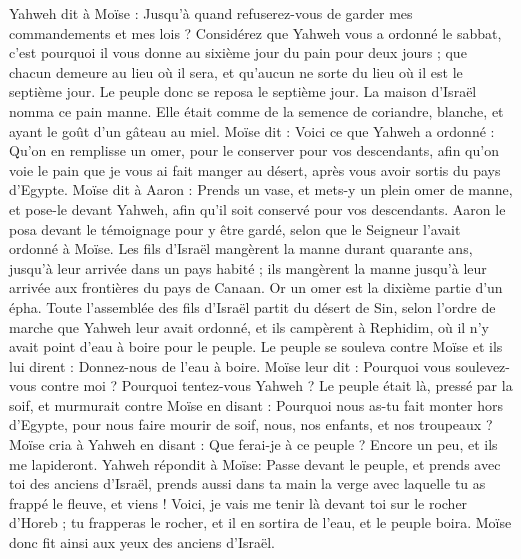 \begin{multicols}{2}
Yahweh dit à Moïse : Jusqu’à quand refuserez-vous de garder mes commandements et mes lois ?
Considérez que Yahweh vous a ordonné le sabbat, c'est pourquoi il vous donne au sixième jour du pain pour deux jours ; que chacun demeure au lieu où il sera, et qu'aucun ne sorte du lieu où il est le septième jour.
Le peuple donc se reposa le septième jour.
La maison d'Israël nomma ce pain manne. Elle était comme de la semence de coriandre, blanche, et ayant le goût d’un gâteau au miel.
Moïse dit : Voici ce que Yahweh a ordonné : Qu'on en remplisse un omer, pour le conserver pour vos descendants, afin qu'on voie le pain que je vous ai fait manger au désert, après vous avoir sortis du pays d'Egypte.
Moïse dit à Aaron : Prends un vase, et mets-y un plein omer de manne, et pose-le devant Yahweh, afin qu’il soit conservé pour vos descendants.
Aaron le posa devant le témoignage pour y être gardé, selon que le Seigneur l'avait ordonné à Moïse.
Les fils d'Israël mangèrent la manne durant quarante ans, jusqu'à leur arrivée dans un pays habité ; ils mangèrent la manne jusqu'à leur arrivée aux frontières du pays de Canaan.
Or un omer est la dixième partie d'un épha.
\VerseOne{}Toute l'assemblée des fils d'Israël partit du désert de Sin, selon l’ordre de marche que Yahweh leur avait ordonné, et ils campèrent à Rephidim, où il n'y avait point d'eau à boire pour le peuple.
Le peuple se souleva contre Moïse et ils lui dirent : Donnez-nous de l'eau à boire. Moïse leur dit : Pourquoi vous soulevez-vous contre moi ? Pourquoi tentez-vous Yahweh ?
Le peuple était là, pressé par la soif, et murmurait contre Moïse en disant : Pourquoi nous as-tu fait monter hors d'Egypte, pour nous faire mourir de soif, nous, nos enfants, et nos troupeaux ?
Moïse cria à Yahweh en disant : Que ferai-je à ce peuple ? Encore un peu, et ils me lapideront.
Yahweh répondit à Moïse: Passe devant le peuple, et prends avec toi des anciens d'Israël, prends aussi dans ta main la verge avec laquelle tu as frappé le fleuve, et viens !
Voici, je vais me tenir là devant toi sur le rocher d’Horeb ; tu frapperas le rocher, et il en sortira de l’eau, et le peuple boira. Moïse donc fit ainsi aux yeux des anciens d'Israël.

\end{multicols}
